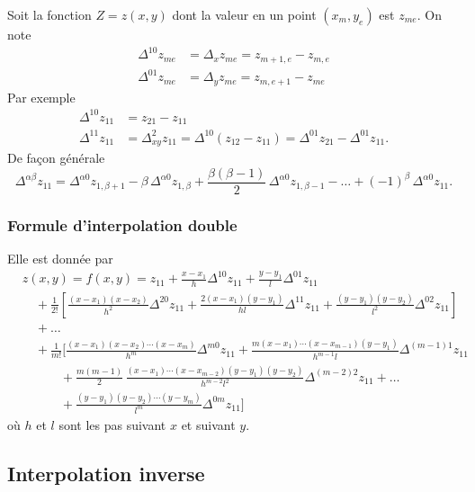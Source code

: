 Soit la fonction $Z = z(x,y)$ dont la valeur en un point $(x_m, y_e)$ est
$z_{me}$. On note
\[
  \begin{aligned}
    \Delta^{10} z_{me} &= \Delta_x z_{me} = z_{m+1,e} - z_{m,e}\\
    \Delta^{01} z_{me} &= \Delta_y z_{me} = z_{m,e+1} - z_{me}
  \end{aligned}
\]
Par exemple
\[
  \begin{aligned}
    \Delta^{10} z_{11} &= z_{21} - z_{11}\\
    \Delta^{11} z_{11} &= \Delta^2_{xy} z_{11} = \Delta^{10}(z_{12} - z_{11})
                        = \Delta^{01} z_{21} - \Delta^{01} z_{11} .
  \end{aligned}
\]
De façon générale
\[
  \Delta^{\alpha\beta} z_{11} = \Delta^{\alpha 0} z_{1,\beta+1}
    - \beta\,\Delta^{\alpha 0} z_{1,\beta}
    + \frac{\beta(\beta-1)}{2}\,\Delta^{\alpha 0} z_{1,\beta-1}
    - \dots + (-1)^{\beta}\,\Delta^{\alpha 0} z_{11} .
\]

\subsubsection{Formule d'interpolation double}

Elle est donnée par
\[
  \begin{aligned}
    &z(x,y) = f(x,y) = z_{11}
      + \frac{x - x_1}{h}\Delta^{10} z_{11} + \frac{y - y_1}{l}\Delta^{01} z_{11}\\
    &\quad + \frac{1}{2!}\left[\frac{(x - x_1)(x - x_2)}{h^2}\Delta^{20} z_{11}
        + \frac{2(x - x_1)(y - y_1)}{hl}\Delta^{11} z_{11}
        + \frac{(y - y_1)(y - y_2)}{l^2}\Delta^{02} z_{11}\right]\\
    &\quad + \dots\\
    &\quad + \frac{1}{m!}\Biggl[\frac{(x - x_1)(x - x_2)\cdots(x - x_m)}{h^m}\Delta^{m0} z_{11}
        + \frac{m(x - x_1)\cdots(x - x_{m-1})(y - y_1)}{h^{m-1}l}\Delta^{(m-1)1} z_{11}\\
    &\qquad\quad + \frac{m(m-1)}{2}\,\frac{(x - x_1)\cdots(x - x_{m-2})(y - y_1)(y - y_2)}{h^{m-2}l^2}
                \Delta^{(m-2)2} z_{11} + \dots\\
    &\qquad\quad + \frac{(y - y_1)(y - y_2)\cdots(y - y_m)}{l^m}\Delta^{0m} z_{11}\Biggr]
  \end{aligned}
\]
où $h$ et $l$ sont les pas suivant $x$ et suivant $y$.

\subsection{Interpolation inverse}

